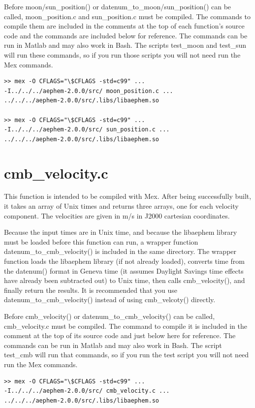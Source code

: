 \documentclass[12pt]{report}
\begin{document}
Before moon/sun\_position() or datenum\_to\_moon/sun\_position() can be called, moon\_position.c and sun\_position.c must be compiled.  The commands to compile them are included in the comments at the top of each function's source code and the commands are included below for reference.  The commands can be run in Matlab and may also work in Bash.  The scripts test\_moon and test\_sun will run these commands, so if you run those scripts you will not need run the Mex commands.

\begin{verbatim}
>> mex -O CFLAGS="\$CFLAGS -std=c99" ...
-I../../../aephem-2.0.0/src/ moon_position.c ...
../../../aephem-2.0.0/src/.libs/libaephem.so

>> mex -O CFLAGS="\$CFLAGS -std=c99" ...
-I../../../aephem-2.0.0/src/ sun_position.c ...
../../../aephem-2.0.0/src/.libs/libaephem.so
\end{verbatim}

\section{cmb\_velocity.c}
This function is intended to be compiled with Mex.  After being successfully built, it takes an array of Unix times and returns three arrays, one for each velocity component.  The velocities are given in m/s in J2000 cartesian coordinates.

Because the input times are in Unix time, and because the libaephem library must be loaded before this function can run, a wrapper function datenum\_to\_cmb\_velocity() is included in the same directory.  The wrapper function loads the libaephem library (if not already loaded), converts time from the datenum() format in Geneva time (it assumes Daylight Savings time effects have already been subtracted out) to Unix time, then calls cmb\_velocity(), and finally return the results.  It is recommended that you use datenum\_to\_cmb\_velocity() instead of using cmb\_velcoty() directly.

Before cmb\_velocity() or datenum\_to\_cmb\_velocity() can be called, cmb\_velocity.c must be compiled.  The command to compile it is included in the comment at the top of its source code and just below here for reference.  The commands can be run in Matlab and may also work in Bash.  The script test\_cmb will run that commands, so if you run the test script you will not need run the Mex commands.

\begin{verbatim}
>> mex -O CFLAGS="\$CFLAGS -std=c99" ...
-I../../../aephem-2.0.0/src/ cmb_velocity.c ...
../../../aephem-2.0.0/src/.libs/libaephem.so
\end{verbatim}
\end{document}
